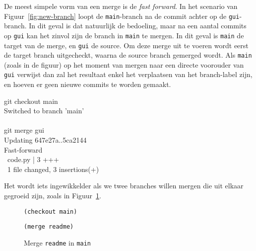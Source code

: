 De meest simpele vorm van een merge is de \emph{fast forward}. In het scenario van Figuur~\ref{fig:new-branch} loopt de \texttt{main}-branch na de commit achter op de \texttt{gui}-branch. In dit geval is dat natuurlijk de bedoeling, maar na een aantal commits op \texttt{gui} kan het zinvol zijn de branch in \texttt{main} te mergen. In dit geval is \texttt{main} de target van de merge, en \texttt{gui} de source. Om deze merge uit te voeren wordt eerst de target branch uitgecheckt, waarna de source branch gemerged wordt. Als \texttt{main} (zoals in de figuur) op het moment van mergen naar een directe voorouder van \texttt{gui} verwijst dan zal het resultaat enkel het verplaatsen van het branch-label zijn, en hoeven er geen nieuwe commits te worden gemaakt.

\begin{bash}
 git checkout main\\
Switched to branch 'main' \\
~ \\
 git merge gui \\
Updating 647e27a..5ca2144 \\
Fast-forward \\
\ code.py | 3 +++ \\
\ 1 file changed, 3 insertions(+) \\
\end{bash}

Het wordt iets ingewikkelder als we twee branches willen mergen die uit elkaar gegroeid zijn, zoals in Figuur~\ref{fig:merge}.

\begin{figure}[ht]
\label{fig:merge}

{ \color{hublue}\tt (checkout\ main) }


{ \color{hublue}\tt (merge\ readme) }

\caption{Merge \texttt{readme} in \texttt{main}}
\end{figure}

